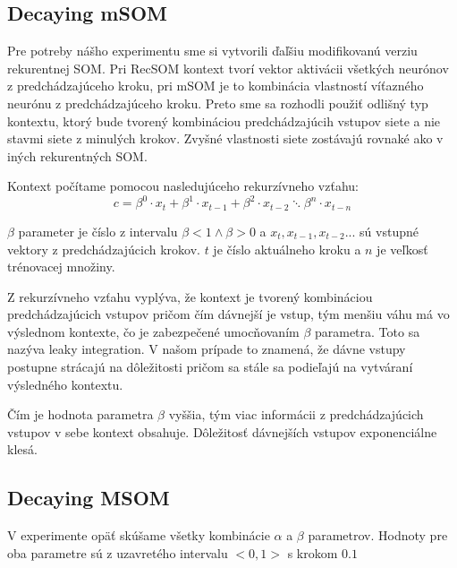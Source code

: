 

\subsection{Decaying mSOM}
Pre potreby nášho experimentu sme si vytvorili ďaľšiu modifikovanú verziu %
rekurentnej SOM. Pri RecSOM kontext tvorí vektor aktivácii všetkých neurónov z predchádzajúceho kroku, 
pri mSOM je to kombinácia vlastností víťazného neurónu z predchádzajúceho kroku. 
Preto sme sa rozhodli použiť odlišný typ kontextu, ktorý bude tvorený kombináciou predchádzajúcih vstupov 
siete a nie stavmi siete z minulých krokov.
Zvyšné vlastnosti siete zostávajú rovnaké ako v iných rekurentných SOM.

Kontext počítame pomocou nasledujúceho rekurzívneho vzťahu:
\begin{equation}
	c = \beta^{0} \cdot x_{t} + \beta^{1} \cdot x_{t-1} + 
	\beta^{2} \cdot x_{t-2} \ddots \beta^{n} \cdot x_{t-n}
\end{equation}

$\beta$ parameter je číslo z intervalu $\beta < 1 \wedge \beta > 0$ a
$x_t, x_{t-1}, x_{t-2} ...$ sú vstupné vektory z predchádzajúcich krokov.
$t$ je číslo aktuálneho kroku a $n$ je veľkosť trénovacej množiny.

Z rekurzívneho vzťahu vyplýva, že kontext je tvorený kombináciou predchádzajúcich vstupov
pričom čím dávnejší je vstup, tým menšiu váhu má vo výslednom kontexte, čo je zabezpečené umocňovaním
$\beta$ parametra. Toto sa nazýva leaky integration. V našom prípade
to znamená, že dávne vstupy postupne strácajú na dôležitosti pričom sa stále sa podieľajú 
na vytváraní výsledného kontextu.

Čím je hodnota parametra $\beta$ vyššia, tým viac informácii z predchádzajúcich vstupov v sebe
kontext obsahuje. Dôležitosť dávnejších vstupov exponenciálne klesá.

\subsection{Decaying MSOM}

V experimente opäť skúšame všetky kombinácie $\alpha$ a $\beta$ parametrov.
Hodnoty pre oba parametre sú z uzavretého intervalu $<0, 1>$ s krokom $0.1$

